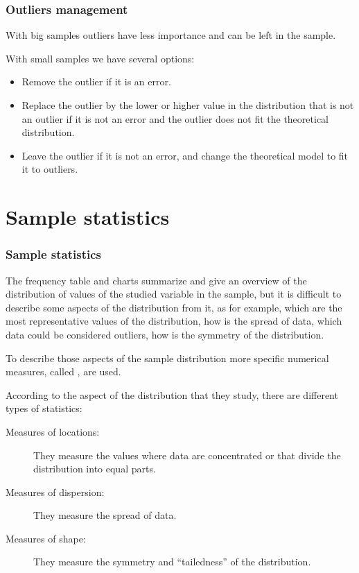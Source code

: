 \begin{frame}
\frametitle{Outliers management}
With big samples outliers have less importance and can be left in the sample.

With small samples we have several options:

\begin{itemize}
\item Remove the outlier if it is an error. 
\item Replace the outlier by the lower or higher value in the distribution that is not an outlier if it is not an error and the outlier does not fit the theoretical distribution. 
\item Leave the outlier if it is not an error, and change the theoretical model to fit it to outliers.  
\end{itemize}
\end{frame}
 


\section{Sample statistics}

\begin{frame}
\frametitle{Sample statistics}
The frequency table and charts summarize and give an overview of the distribution of values of the studied variable in the sample, but it is difficult to describe some aspects of the distribution from it, as for example, which are the most representative values of the distribution, how is the spread of data, which data could be considered outliers, how is the symmetry of the distribution. 

To describe those aspects of the sample distribution more specific numerical measures, called
, are used.

According to the aspect of the distribution that they study, there are different types of statistics:
\begin{description}
\item[Measures of locations:] They measure the values where data are concentrated or that divide the distribution into
equal parts. 
\item[Measures of dispersion:] They measure the spread of data.
\item[Measures of shape:] They measure the symmetry and ``tailedness'' of the distribution.  
\end{description}
\end{frame}



